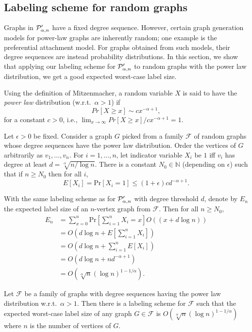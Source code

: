 \subsection{Labeling scheme for random graphs}
Graphs in $ \mathcal{P}'_{\alpha,n}$ have a fixed degree sequence. However, certain graph generation models for power-law graphs are inherently random; one example is the preferential attachment model. For graphs obtained from such models, their degree sequences are instead probability distributions. In this section, we show that applying our labeling scheme for $ \mathcal{P}'_{\alpha,n}$ to random graphs with the power law distribution, we get a good expected worst-case label size.

Using the definition of Mitzenmacher, a random variable $X$ is said to have the \emph{power law} distribution (w.r.t.~$\alpha > 1$) if
\[
  Pr[X\geq x] \sim cx^{-\alpha+1},
\]
for a constant $c > 0$, i.e., $\lim_{x\to\infty}Pr[X\geq x]/cx^{-\alpha+1} = 1$.

Let $\epsilon > 0$ be fixed. Consider a graph $G$ picked from a family $\mathcal F$ of random graphs whose degree sequences have the power law distribution. Order the vertices of $G$ arbitrarily as $v_1,\ldots,v_n$. For $i=1,\ldots,n$, let indicator variable $X_i$ be $1$ iff $v_i$ has degree at least $d = \sqrt[\alpha]{n/\log n}$. There is a constant $N_0\in\mathbb N$ (depending on $\epsilon$) such that if $n\geq N_0$ then for all $i$,
\[
  E[X_i] = \mbox{Pr}[X_i = 1]\leq (1+\epsilon)cd^{-\alpha+1}.
\]

With the same labeling scheme as for $ \mathcal{P}'_{\alpha,n}$ with degree threshold $d$, denote by $E_n$ the expected label size of an $n$-vertex graph from $\mathcal F$. Then for all $n\geq N_0$,
\begin{align*}
  E_n & = \sum_{x=0}^n \mbox{Pr}\left[\sum_{i=1}^n X_i = x\right]O((x+d\log n))\\
                       & = O\left(d\log n + E\left[\sum_{i=1}^n X_i\right]\right)\\
                       & = O\left(d\log n + \sum_{i=1}^n E[X_i]\right)\\
                       & = O\left(d\log n + nd^{-\alpha+1}\right)\\
                       & = O\left(\sqrt[\alpha]n(\log n)^{1-1/\alpha}\right).
\end{align*}
\begin{theorem}\label{th:random}
Let $\mathcal F$ be a family of graphs with degree sequences having the power law distribution w.r.t.~$\alpha > 1$. Then there is a labeling scheme for $\mathcal F$ such that the expected worst-case label size of any graph $G\in\mathcal F$ is $O(\sqrt[\alpha]n(\log n)^{1-1/\alpha})$ where $n$ is the number of vertices of $G$.
\end{theorem}
